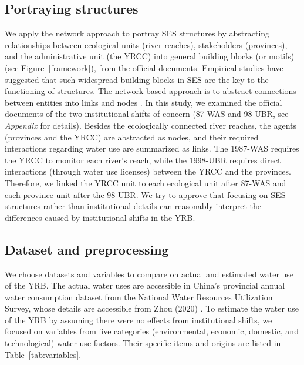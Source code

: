 \documentclass[default, sn-standardnature]{sn-jnl} %
\providecommand{\DIFaddtex}[1]{{\protect\color{blue}\uwave{#1}}} %
\providecommand{\DIFdeltex}[1]{{\protect\color{red}\sout{#1}}}                      %
\providecommand{\DIFaddbegin}{} %
\providecommand{\DIFaddend}{} %
\providecommand{\DIFdelbegin}{} %
\providecommand{\DIFdelend}{} %
\providecommand{\DIFadd}[1]{\texorpdfstring{\DIFaddtex{#1}}{#1}} %
\providecommand{\DIFdel}[1]{\texorpdfstring{\DIFdeltex{#1}}{}} %
\newcommand{\DIFscaledelfig}{0.5}
\newlength{\DIFdelgraphicswidth} %
\newlength{\DIFdelgraphicsheight} %
\newcommand{\DIFaddincludegraphics}[2][]{{\color{blue}\fbox{\DIFOincludegraphics[#1]{#2}}}} %
\newcommand{\DIFdelincludegraphics}[2][]{%
\sbox{\DIFdelgraphicsbox}{\DIFOincludegraphics[#1]{#2}}%
\settoboxwidth{\DIFdelgraphicswidth}{\DIFdelgraphicsbox} %
\settoboxtotalheight{\DIFdelgraphicsheight}{\DIFdelgraphicsbox} %
\scalebox{\DIFscaledelfig}{%
\parbox[b]{\DIFdelgraphicswidth}{\usebox{\DIFdelgraphicsbox}\\[-\baselineskip] \rule{\DIFdelgraphicswidth}{0em}}\llap{\resizebox{\DIFdelgraphicswidth}{\DIFdelgraphicsheight}{%
\setlength{\unitlength}{\DIFdelgraphicswidth}%
\begin{picture}(1,1)%
\thicklines\linethickness{2pt} %
{\color[rgb]{1,0,0}\put(0,0){\framebox(1,1){}}}%
{\color[rgb]{1,0,0}\put(0,0){\line( 1,1){1}}}%
{\color[rgb]{1,0,0}\put(0,1){\line(1,-1){1}}}%
\end{picture}%
}\hspace*{3pt}}} %
} %
\DeclareRobustCommand{\DIFaddbegin}{\DIFOaddbegin \let\includegraphics\DIFaddincludegraphics} %
\DeclareRobustCommand{\DIFaddend}{\DIFOaddend \let\includegraphics\DIFOincludegraphics} %
\DeclareRobustCommand{\DIFdelbegin}{\DIFOdelbegin \let\includegraphics\DIFdelincludegraphics} %
\DeclareRobustCommand{\DIFdelend}{\DIFOaddend \let\includegraphics\DIFOincludegraphics} %
\begin{document}
\DIFaddend \subsection{Portraying structures}\label{sec:structures}
We apply the network \cite{bodin2017b} approach to portray SES structures by abstracting relationships between ecological units (river reaches), stakeholders (provinces), and the administrative unit (the YRCC) into general building blocks (or motifs) (see Figure~\ref{framework}), from the official documents.
Empirical studies have suggested that such widespread building blocks in SES are the key to the functioning of structures. The network-based approach is to abstract connections between entities into links and nodes \cite{bodin2017a,kluger2020,guerrero2015}.
In this study, we examined the official documents of the two institutional shifts of concern (87-WAS and 98-UBR, see \textit{Appendix } for details).
Besides the ecologically connected river reaches, the agents (provinces and the YRCC) are abstracted as nodes, and their required interactions regarding water use are summarized as links.
The 1987-WAS requires the YRCC to monitor each river's reach, while the 1998-UBR requires direct interactions (through water use licenses) between the YRCC and the provinces.
Therefore, we linked the YRCC unit to each ecological unit after 87-WAS and each province unit after the 98-UBR.
We \DIFdelbegin \DIFdel{try to approve that }\DIFdelend \DIFaddbegin \DIFadd{tested whether }\DIFaddend focusing on SES structures rather than institutional details \DIFdelbegin \DIFdel{can reasonably interpret }\DIFdelend \DIFaddbegin \DIFadd{could reasonably explain }\DIFaddend the differences caused by institutional shifts in the YRB.

\subsection{Dataset and preprocessing}\label{sec:dataset}
We choose datasets and variables to compare on actual and estimated water use of the YRB.
The actual water uses are accessible in China’s provincial annual water consumption dataset from the National Water Resources Utilization Survey, whose details are accessible from Zhou (2020) \cite{zhou2020}.
To estimate the water use of the YRB by assuming there were no effects from institutional shifts, we focused on variables from five categories (environmental, economic, domestic, and technological) water use factors. Their specific items and origins are listed in Table~\ref{tab:variables}.
\end{document}
